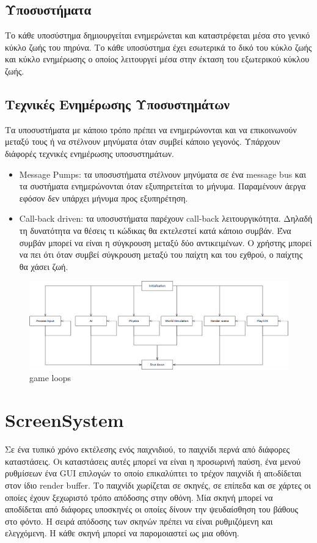 	\subsection{Υποσυστήματα}
	Το κάθε υποσύστημα δημιουργείται ενημερώνεται και καταστρέφεται μέσα στο γενικό κύκλο ζωής του πηρύνα. Το κάθε υποσύστημα έχει εσωτερικά το δικό του κύκλο ζωής και κύκλο ενημέρωσης ο οποίος λειτουργεί μέσα στην έκταση του εξωτερικού κύκλου ζωής.
	
	\subsection{Τεχνικές Ενημέρωσης Υποσυστημάτων}
	Τα υποσυστήματα με κάποιο τρόπο πρέπει να ενημερώνονται και να επικοινωνούν μεταξύ τους ή να στέλνουν μηνύματα όταν συμβεί κάποιο γεγονός. Υπάρχουν διάφορές τεχνικές ενημέρωσης υποσυστημάτων.
	\begin{itemize}
	\item Message Pumps: τα υποσυστήματα στέλνουν μηνύματα σε ένα message bus και τα συστήματα ενημερώνονται όταν εξυπηρετείται το μήνυμα. Παραμένουν άεργα εφόσον δεν υπάρχει μήνυμα προς εξυπηρέτηση.
	\item Call-back driven: τα υποσυστήματα παρέχουν call-back λειτουργικότητα. Δηλαδή τη δυνατότητα να θέσεις τι κώδικας θα εκτελεστεί κατά κάποιο συμβάν. Ένα συμβάν μπορεί να είναι η σύγκρουση μεταξύ δύο αντικειμένων. Ο χρήστης μπορεί να πει ότι όταν συμβεί σύγκρουση μεταξύ του παίχτη και του εχθρού, ο παίχτης θα χάσει ζωή.
	\end{itemize}
	
	\begin{figure}[h!]
		\centering
		\includegraphics[width=160mm]{Images/gameloops_update}
		\caption{game loops}
		\label{fig:gameloops}
	\end{figure}
		
	\section{ScreenSystem}
	Σε ένα τυπικό χρόνο εκτέλεσης ενός παιχνιδιού, το παιχνίδι περνά από διάφορες καταστάσεις. Οι καταστάσεις αυτές μπορεί να είναι η προσωρινή παύση, ένα μενού ρυθμίσεων ένα \gls{GUI} επιλογών το οποίο επικαλύπτει το τρέχον παιχνίδι ή απoδίδεται στον ίδιο render buffer. Το παιχνίδι χωρίζεται σε σκηνές, σε επίπεδα και σε χάρτες οι οποίες έχουν ξεχωριστό τρόπο απόδοσης στην οθόνη. Μία σκηνή μπορεί να αποδίδεται από διάφορες υποσκηνές οι οποίες δίνουν την ψευδαίσθηση του βάθους στο φόντο. Η σειρά απόδοσης των σκηνών πρέπει να είναι ρυθμιζόμενη και ελεγχόμενη. Η κάθε σκηνή μπορεί να παρομοιαστεί ως μια οθόνη.

